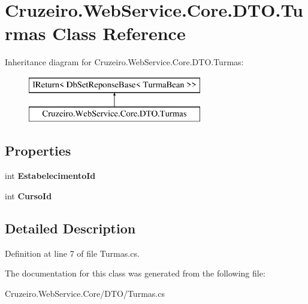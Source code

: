 \hypertarget{class_cruzeiro_1_1_web_service_1_1_core_1_1_d_t_o_1_1_turmas}{}\section{Cruzeiro.\+Web\+Service.\+Core.\+D\+T\+O.\+Turmas Class Reference}
\label{class_cruzeiro_1_1_web_service_1_1_core_1_1_d_t_o_1_1_turmas}
Inheritance diagram for Cruzeiro.\+Web\+Service.\+Core.\+D\+T\+O.\+Turmas\+:\begin{figure}[H]
\begin{center}
\leavevmode
\includegraphics[height=2.000000cm]{class_cruzeiro_1_1_web_service_1_1_core_1_1_d_t_o_1_1_turmas}
\end{center}
\end{figure}
\subsection*{Properties}
\begin{DoxyCompactItemize}
\item 
int {\bfseries Estabelecimento\+Id}\hypertarget{class_cruzeiro_1_1_web_service_1_1_core_1_1_d_t_o_1_1_turmas_a42fa21d6a8446f7aadd0411dd83f38a3}{}\label{class_cruzeiro_1_1_web_service_1_1_core_1_1_d_t_o_1_1_turmas_a42fa21d6a8446f7aadd0411dd83f38a3}

\item 
int {\bfseries Curso\+Id}\hypertarget{class_cruzeiro_1_1_web_service_1_1_core_1_1_d_t_o_1_1_turmas_ac853811940008a9c32e798c0923fdc18}{}\label{class_cruzeiro_1_1_web_service_1_1_core_1_1_d_t_o_1_1_turmas_ac853811940008a9c32e798c0923fdc18}

\end{DoxyCompactItemize}


\subsection{Detailed Description}


Definition at line 7 of file Turmas.\+cs.



The documentation for this class was generated from the following file\+:\begin{DoxyCompactItemize}
\item 
Cruzeiro.\+Web\+Service.\+Core/\+D\+T\+O/Turmas.\+cs\end{DoxyCompactItemize}
